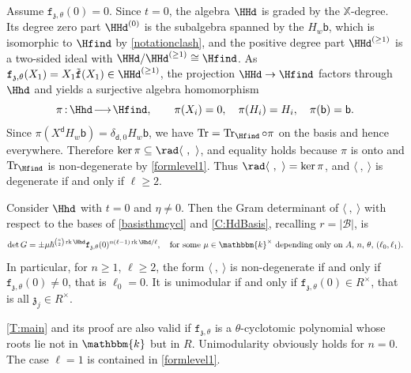 \documentclass[a4paper,11pt]{amsart}
\def\map#1#2{\,{:}\,#1\!\longrightarrow\!#2}
\let\<\langle
\let\>\rangle
\newcommand{\Tr}{\op{Tr}}
\newcommand\cB{\mathcal{B}}
\numberwithin{equation}{subsection}
\theoremstyle{definition}
\theoremstyle{theorem}
\theoremstyle{remark}
\newcommand\charge{{\mathfrak{z}}}
\newcommand\kapp{{\mathfrak{z}}}
\newcommand\fct{\mathtt{f}_{\charge,\theta}}
\newcommand\bd{\mathsf{d}}
\newcommand\bb{\mathsf{b}}
\newcommand\op{\operatorname}
\newcommand\X{\mathbb{X}}
\newcommand\kk{\mathbbm{k}}
\begin{document}
\begin{Remark}\label{P:radical}
  Assume $\fct(0)=0$. Since $t=0$, the algebra $\HHd$ is graded by the $\X$-degree. Its degree zero
  part $\HHd^{(0)}$ is the subalgebra spanned by the $H_w\bb$, which is isomorphic to $\Hfind$ by
  \autoref{notationclash}, and the positive degree part $\HHd^{(\geq1)}$ is a two-sided ideal with
  $\HHd/\HHd^{(\geq1)}\cong\Hfind$. As $\fct(X_1)=X_1\tilde{\mathtt f}(X_1)\in\HHd^{(\geq1)}$, the
  projection $\HHd\to\Hfind$ factors through $\Hhd$ and yields a surjective algebra homomorphism
  \[
    \pi\map{\Hhd}{\Hfind},\qquad \pi(X_i)=0,\quad \pi(H_i)=H_i,\quad \pi(\bb)=\bb .
  \]
  Since $\pi(X^{\bd}H_w\bb)=\delta_{\bd,0}H_w\bb$, we have $\Tr=\Tr_{\Hfind}\circ\pi$ on the basis and
  hence everywhere. Therefore $\ker\pi\subseteq\rad\<\ ,\ \>$, and equality holds because $\pi$ is
  onto and $\Tr_{\Hfind}$ is non-degenerate by \autoref{formlevel1}. Thus
  $\rad\<\ ,\ \>=\ker\pi$, and
  $\<\ ,\ \>$ is degenerate if and only if $\ell\geq2$.
\end{Remark}

\begin{Proposition}\label{T:main}
 Consider $\Hhd$ with $t=0$ and $\eta\not=0$. Then
   the Gram determinant of $\<\ ,\ \>$ with respect to the bases
  of \autoref{basisthmcycl} and \autoref{C:HdBasis}, recalling $r=|\cB|$, is
  \[
   \det G=\pm\mu\hbar^{\binom{n}{2}\op{rk}\Hhd}
           \fct(0)^{n(\ell-1)\op{rk}\Hhd/\ell},
    \quad\text{for some $\mu\in\kk^{\times}$ depending only on $A$, $n$, $\theta$, $(\ell_0,\ell_1)$}.
  \]
  In particular, for $n\geq1$, $\ell\geq2$, the form $\<\ ,\ \>$ is non-degenerate if and only if
  $\fct(0)\not=0$, that is $\ell_0=0$. It is unimodular if and only if
  $\fct(0)\in R^{\times}$, that is all $\kapp_j\in R^{\times}$.
\end{Proposition}

\begin{Remark}\label{rootsinR}
 \autoref{T:main} and its proof are also valid if  $\fct$ is a  $\theta$-cyclotomic polynomial whose roots lie not in $\kk$ but  in
  $R$.  Unimodularity obviously holds for $n=0$. The case  $\ell=1$  is contained in
\autoref{formlevel1}.
\end{Remark}
\end{document}
